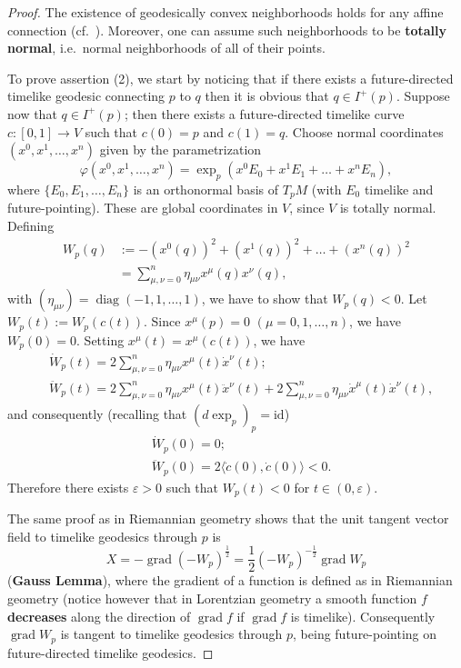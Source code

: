 \documentclass[10pt]{amsart}
\newcommand{\grad}{\operatorname{grad}}
\newcommand{\diag}{\operatorname{diag}}
\theoremstyle{definition}
\theoremstyle{remark}
\begin{document}
\begin{proof}
The existence of geodesically convex neighborhoods holds for any affine connection (cf.~\cite{KN96}). Moreover, one can assume such neighborhoods to be {\bf totally normal}, i.e.~normal neighborhoods of all of their points.

To prove assertion (2), we start by noticing that if there exists a future-directed timelike geodesic connecting $p$ to $q$ then it is obvious that $q \in I^+(p)$. Suppose now that $q \in I^+(p)$; then there exists a future-directed timelike curve $c:[0,1] \to V$ such that $c(0)=p$ and $c(1)=q$. Choose normal coordinates $(x^0, x^1, \ldots, x^n)$ given by the parametrization
\[
\varphi(x^0,x^1,\ldots,x^n)=\exp_p(x^0 E_0 + x^1 E_1 + \ldots + x^n E_n),
\]
where $\{E_0,E_1,\ldots,E_n\}$ is an orthonormal basis of $T_pM$ (with $E_0$ timelike and future-pointing). These are global coordinates in $V$, since $V$ is totally normal. Defining
\begin{align*}
W_p(q) & := - (x^0(q))^2 + (x^1(q))^2 + \ldots + (x^n(q))^2 \\
& = \sum_{\mu,\nu=0}^n \eta_{\mu\nu}x^\mu(q)x^\nu(q),
\end{align*}
with $(\eta_{\mu\nu}) = \diag(-1,1,\ldots,1)$, we have to show that $W_p(q)<0$. Let $W_p(t):= W_p(c(t))$. Since $x^\mu(p)=0$ $(\mu = 0,1,\ldots,n)$, we have $W_p(0)=0$. Setting $x^\mu(t)=x^\mu(c(t))$, we have
\begin{align*}
& \dot{W}_p(t) = 2 \sum_{\mu,\nu=0}^n \eta_{\mu\nu}x^\mu(t)\dot{x}^\nu(t);\\
& \ddot{W}_p(t) = 2 \sum_{\mu,\nu=0}^n \eta_{\mu\nu}x^\mu(t)\ddot{x}^\nu(t) + 2\sum_{\mu,\nu=0}^n \eta_{\mu\nu}\dot{x}^\mu(t)\dot{x}^\nu(t),
\end{align*}
and consequently (recalling that $\left(d \exp_p\right)_p = \text{id}$)
\begin{align*}
& \dot{W}_p(0) = 0;\\
& \ddot{W}_p(0) = 2\langle \dot{c}(0), \dot{c}(0) \rangle < 0.
\end{align*}
Therefore there exists $\varepsilon > 0$ such that $W_p(t) < 0$ for $t \in (0, \varepsilon)$.

The same proof as in Riemannian geometry shows that the unit tangent vector field to timelike geodesics through $p$ is
\[
X = - \grad\left(-W_p\right)^\frac12 = \frac12 \left(-W_p\right)^{-\frac12} \grad W_p
\]
({\bf Gauss Lemma}), where the gradient of a function is defined as in Riemannian geometry (notice however that in Lorentzian geometry a smooth function $f$ {\bf decreases} along the direction of $\grad f$ if $\grad f$ is timelike). Consequently $\grad W_p$ is tangent to timelike geodesics through $p$, being future-pointing on future-directed timelike geodesics.


\end{proof}
\end{document}
